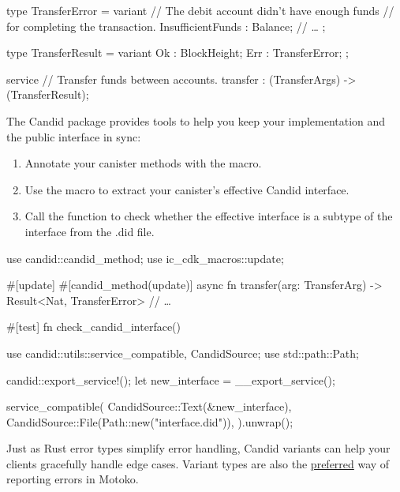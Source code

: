 \documentclass{article}
\begin{document}
\begin{code}[good]
type TransferError = variant {
  // The debit account didn't have enough funds
  // for completing the transaction.
  InsufficientFunds : Balance;
  // \ldots
};

type TransferResult =
  variant { Ok : BlockHeight; Err : TransferError; };

service {
  // Transfer funds between accounts.
  transfer : (TransferArgs) -> (TransferResult);
}
\end{code}

The Candid package provides tools to help you keep your implementation and the public interface in sync:

\begin{enumerate}
\item
  Annotate your canister methods with the \href{https://docs.rs/candid/0.8.2/candid/attr.candid_method.html}{} macro.
\item
  Use the \href{https://docs.rs/candid/0.8.2/candid/macro.export_service.html}{} macro to extract your canister's effective Candid interface.
\item
  Call the \href{https://docs.rs/candid/0.8.2/candid/utils/fn.service_compatible.html}{} function to check whether the effective interface is a subtype of the interface from the .did file.
\end{enumerate}

\begin{code}[good]
use candid::candid_method;
use ic_cdk_macros::update;

#[update]
#[candid_method(update)] 
async fn transfer(arg: TransferArg) -> Result<Nat, TransferError> {
  // \ldots
}

#[test]
fn check_candid_interface() {
  use candid::utils::{service_compatible, CandidSource};
  use std::path::Path;

  candid::export_service!(); 
  let new_interface = __export_service();

  service_compatible( 
    CandidSource::Text(&new_interface),
    CandidSource::File(Path::new("interface.did")),
  ).unwrap();
}
\end{code}


Just as Rust error types simplify error handling, Candid variants can help your clients gracefully handle edge cases.
Variant types are also the \href{https://sdk.dfinity.org/docs/language-guide/errors.html#_prefer_optionresult_over_exceptions_where_possible}{preferred} way of reporting errors in Motoko.
\end{document}
